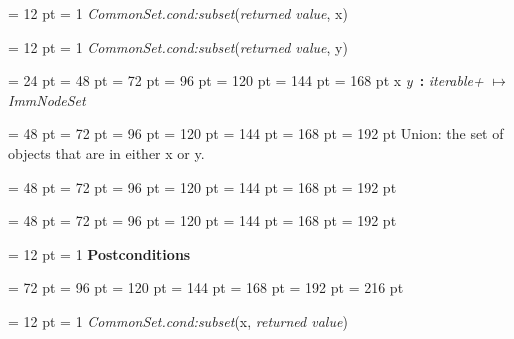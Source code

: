 {{{{{{{{\par \pagebreak[3.000000] \noindent \hangindent = 12 pt \hangafter = 1 
 {\em CommonSet.cond:subset\/}({\em returned value\/}, x)\par}
{\par \pagebreak[3.000000] \noindent \hangindent = 12 pt \hangafter = 1 
 {\em CommonSet.cond:subset\/}({\em returned value\/}, y)\par}
\par}
\par}
\par}
\par}
\par}
\par}
{\par \noindent  \leftskip = 24 pt  \leftmargini = 48 pt  \leftmarginii = 72 pt  \leftmarginiii = 96 pt  \leftmarginiv = 120 pt  \leftmarginv = 144 pt  \leftmarginvi = 168 pt x {\large {\bf {\textbar}\/}} {\em y\/}~{\bf :}  {\em iterable+\/} \(\mapsto \)  {\em ImmNodeSet\/}{\par \noindent
{\par \noindent  \leftskip = 48 pt  \leftmargini = 72 pt  \leftmarginii = 96 pt  \leftmarginiii = 120 pt  \leftmarginiv = 144 pt  \leftmarginv = 168 pt  \leftmarginvi = 192 pt 
Union: the set of objects that are in either x or y.\par}
{\par \noindent  \leftskip = 48 pt  \leftmargini = 72 pt  \leftmarginii = 96 pt  \leftmarginiii = 120 pt  \leftmarginiv = 144 pt  \leftmarginv = 168 pt  \leftmarginvi = 192 pt {\par \noindent
\par}
\par}
{\par \noindent  \leftskip = 48 pt  \leftmargini = 72 pt  \leftmarginii = 96 pt  \leftmarginiii = 120 pt  \leftmarginiv = 144 pt  \leftmarginv = 168 pt  \leftmarginvi = 192 pt {\par \noindent
{\par \pagebreak[3.100000] \noindent \hangindent = 12 pt \hangafter = 1 
{\bf Postconditions\/}\par}
{\par \noindent  \leftskip = 72 pt  \leftmargini = 96 pt  \leftmarginii = 120 pt  \leftmarginiii = 144 pt  \leftmarginiv = 168 pt  \leftmarginv = 192 pt  \leftmarginvi = 216 pt {\par \noindent
{\par \pagebreak[3.000000] \noindent \hangindent = 12 pt \hangafter = 1 
 {\em CommonSet.cond:subset\/}(x, {\em returned value\/})\par}
}}}}}}}
